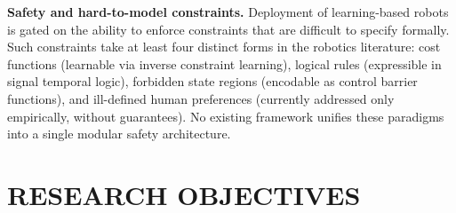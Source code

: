 \documentclass[11pt,a4paper]{article}
\begin{document}
\textbf{Safety and hard-to-model constraints.}
Deployment of learning-based robots is gated on the ability to enforce constraints
that are difficult to specify formally.
Such constraints take at least four distinct forms in the robotics literature:
cost functions (learnable via inverse constraint learning),
logical rules (expressible in signal temporal logic),
forbidden state regions (encodable as control barrier functions), and
ill-defined human preferences (currently addressed only empirically, without guarantees).
No existing framework unifies these paradigms into a single modular safety architecture.

\section*{RESEARCH OBJECTIVES}
\end{document}

